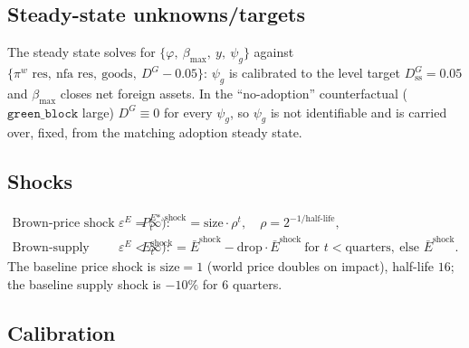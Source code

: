 \documentclass[11pt]{article}
\newcommand{\stst}{\mathrm{ss}}
\newcommand{\DG}{D^{G}}
\begin{document}
\subsection{Steady-state unknowns/targets}

The steady state solves for $\{\varphi,\ \beta_{\max},\ y,\ \psi_g\}$ against
$\{\pi^{w}\text{ res},\ \mathrm{nfa}\text{ res},\ \text{goods},\ \DG-0.05\}$: $\psi_g$
is calibrated to the level target $\DG_{\stst}=0.05$ and $\beta_{\max}$ closes net
foreign assets. In the ``no-adoption'' counterfactual ($\texttt{green\_block}$
large) $\DG\equiv 0$ for every $\psi_g$, so $\psi_g$ is not identifiable and is
carried over, fixed, from the matching adoption steady state.

\subsection{Shocks}

\begin{align}
\text{Brown-price shock (requires }\varepsilon^{E}=\infty):&\quad
P^{E*,\text{shock}}_t=\text{size}\cdot\rho^{t},\quad \rho=2^{-1/\text{half-life}},\\
\text{Brown-supply shock (requires }\varepsilon^{E}<\infty):&\quad
E^{\text{shock}}_t=\bar E^{\text{shock}}-\text{drop}\cdot\bar E^{\text{shock}}\ \text{for }t<\text{quarters},\ \text{else }\bar E^{\text{shock}} .
\end{align}
The baseline price shock is $\text{size}=1$ (world price doubles on impact),
half-life $16$; the baseline supply shock is $-10\%$ for $6$ quarters.

\subsection{Calibration}\label{sec:cal}
\end{document}
